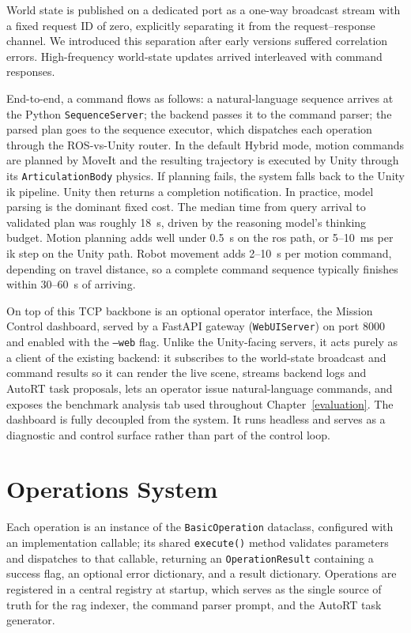 \documentclass[
     12pt,
     a4paper,
     BCOR=10mm,
     DIV=14,
     listof=totoc,
     bibliography=totoc,
     parskip,
     twoside,
     headsepline
     ]{scrreprt}
\begin{document}
World state is published on a dedicated port as a one-way broadcast stream with a fixed request ID of zero, explicitly separating it from the request--response channel. We introduced this separation after early versions suffered correlation errors. High-frequency world-state updates arrived interleaved with command responses.

End-to-end, a command flows as follows: a natural-language sequence arrives at the Python \texttt{SequenceServer}; the backend passes it to the command parser; the parsed plan goes to the sequence executor, which dispatches each operation through the ROS-vs-Unity router. In the default Hybrid mode, motion commands are planned by MoveIt and the resulting trajectory is executed by Unity through its \texttt{ArticulationBody} physics. If planning fails, the system falls back to the Unity \gls{ik} pipeline. Unity then returns a completion notification. In practice, model parsing is the dominant fixed cost. The median time from query arrival to validated plan was roughly 18~s, driven by the reasoning model's thinking budget. Motion planning adds well under 0.5~s on the \gls{ros} path, or 5--10~ms per \gls{ik} step on the Unity path. Robot movement adds 2--10~s per motion command, depending on travel distance, so a complete command sequence typically finishes within 30--60~s of arriving.

On top of this TCP backbone is an optional operator interface, the Mission Control dashboard, served by a FastAPI gateway (\texttt{WebUIServer}) on port 8000 and enabled with the \texttt{--web} flag. Unlike the Unity-facing servers, it acts purely as a client of the existing backend: it subscribes to the world-state broadcast and command results so it can render the live scene, streams backend logs and AutoRT task proposals, lets an operator issue natural-language commands, and exposes the benchmark analysis tab used throughout Chapter~\ref{evaluation}. The dashboard is fully decoupled from the system. It runs headless and serves as a diagnostic and control surface rather than part of the control loop.

\section{Operations System}\label{sec:ops-impl}
Each operation is an instance of the \texttt{BasicOperation} dataclass, configured with an implementation callable; its shared \texttt{execute()} method validates parameters and dispatches to that callable, returning an \texttt{OperationResult} containing a success flag, an optional error dictionary, and a result dictionary. Operations are registered in a central registry at startup, which serves as the single source of truth for the \gls{rag} indexer, the command parser prompt, and the AutoRT task generator.
\end{document}
